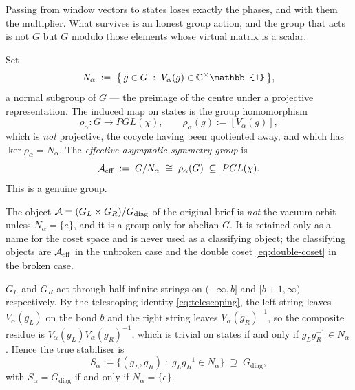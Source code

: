 Passing from window vectors to states loses exactly the phases, and with them
the multiplier. What survives is an honest group action, and the group that
acts is not $G$ but $G$ modulo those elements whose virtual matrix is a scalar.

\begin{definition}
\label{def:effective-asg}
Set
\begin{equation}
  N_{\alpha} \; := \; \bigl\{\, g \in G \;:\;
  V_{\alpha}(g) \in \C^{\times}\mathbb{1} \,\bigr\},
\end{equation}
a normal subgroup of $G$ --- the preimage of the centre under a projective
representation. The induced map on states is the group homomorphism
\begin{equation}
  \rho_{\alpha} : G \longrightarrow PGL(\chi),
  \qquad \rho_{\alpha}(g) := [V_{\alpha}(g)],
\end{equation}
which is \emph{not} projective, the cocycle having been quotiented away, and
which has $\ker \rho_{\alpha} = N_{\alpha}$. The \emph{effective asymptotic
symmetry group} is
\begin{equation}
  \mathcal{A}_{\mathrm{eff}} \; := \; G/N_{\alpha} \;\cong\; \rho_{\alpha}(G) \;\subseteq\; PGL(\chi) .
  \label{eq:aeff}
\end{equation}
This is a genuine group.
\end{definition}

\begin{remark}
\label{rem:asg-superseded}
The object $\mathcal{A} = (G_{L} \times G_{R})/G_{\mathrm{diag}}$ of the original brief
is \emph{not} the vacuum orbit unless $N_{\alpha} = \{e\}$, and it is a group
only for abelian $G$. It is retained only as a name for the coset space and is
never used as a classifying object; the classifying objects are $\mathcal{A}_{\mathrm{eff}}$ in the
unbroken case and the double coset \eqref{eq:double-coset} in the broken case.
\end{remark}

\begin{definition}
\label{def:two-asymptotic-copies}
$G_{L}$ and $G_{R}$ act through half-infinite strings on $(-\infty,b]$ and
$[b+1,\infty)$ respectively. By the telescoping identity
\eqref{eq:telescoping}, the left string leaves $V_{\alpha}(g_{L})$ on the bond
$b$ and the right string leaves $V_{\alpha}(g_{R})^{-1}$, so the composite
residue is $V_{\alpha}(g_{L}) V_{\alpha}(g_{R})^{-1}$, which is trivial on
states if and only if $g_{L} g_{R}^{-1} \in N_{\alpha}$. Hence the true
stabiliser is
\begin{equation}
  S_{\alpha} := \bigl\{ (g_{L},g_{R}) \;:\;
  g_{L} g_{R}^{-1} \in N_{\alpha} \bigr\} \;\supseteq\; G_{\mathrm{diag}},
\end{equation}
with $S_{\alpha} = G_{\mathrm{diag}}$ if and only if $N_{\alpha} = \{e\}$.
\end{definition}

